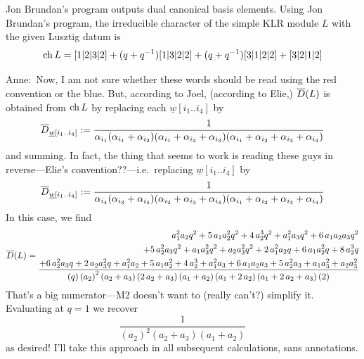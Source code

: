 \documentclass[11pt]{article}
\newcommand{\anne}[1]{{\color{pink!50!blue}Anne:~#1}}
\begin{document}
\begin{description}
Jon Brundan's program outputs dual canonical basis elements.
Using Jon Brundan's program, the irreducible character of the simple KLR module $L$ with the given Lusztig datum is 
\[
    \operatorname{ch} L = [1|2|3|2]+(q+q^{-1})[1|3|2|2]+(q+q^{-1})[3|1|2|2]+[3|2|1|2]
\]
\anne{Now, I am not sure whether these words should be read using the red convention or the blue. But, according to Joel, (according to Elie,) $\overline{D}(L)$  is obtained from $\operatorname{ch} L$ by replacing each $\underline{w}[i_1..i_4]$ by 
$$\overline{D}_{\underline{w}[i_1..i_4]}:= \frac 1 {\alpha_{i_1}(\alpha_{i_1} + \alpha_{i_2})(\alpha_{i_1} + \alpha_{i_2} + \alpha_{i_3})(\alpha_{i_1}+\alpha_{i_2} + \alpha_{i_3}+\alpha_{i_4})}$$ and summing. In fact, the thing that seems to work is reading these guys in reverse---Elie's convention??---i.e.\ replacing $\underline{w}[i_1..i_4]$ by 
$$\overline{D}_{\underline{w}[i_1..i_4]}:= \frac 1 {\alpha_{i_4}(\alpha_{i_3} + \alpha_{i_4})(\alpha_{i_2} + \alpha_{i_3} + \alpha_{i_4})(\alpha_{i_1}+\alpha_{i_2} + \alpha_{i_3}+\alpha_{i_4})}$$ 
In this case, we find %
{\tiny
$$
\overline{D} (L) =
\begin{aligned}{a}_{1}^{2}{a}_{2}q^{2}+5\,{a}_{1}{a}_{2}^{2}q^{2}+4\,{a}_{2}^{3}q^{2}+{a}_{1}^{2}{a}_{3}q^{2}+6\,{a}_{1}{a}_{2}{a}_{3}q^{2}\\
    +5\,{a}_{2}^{2}{a}_{3}q^{2}+{a}_{1}{a}_{3}^{2}q^{2}+{a}_{2}{a}_{3}^{2}q^{2}+2\,{a}_{1}^{2}{a}_{2}q+6\,{a}_{1}{a}_{2}^{2}q+8\,{a}_{2}^{3}q \\ 
    \frac{+6\,{a}_{2}^{2}{a}_{3}q+2\,{a}_{2}{a}_{3}^{2}q+{a}_{1}^{2}{a}_{2}+5\,{a}_{1}{a}_{2}^{2}+4\,{a}_{2}^{3}+{a}_{1}^{2}{a}_{3}+6\,{a}_{1}{a}_{2}{a}_{3}+5\,{a}_{2}^{2}{a}_{3}+{a}_{1}{a}_{3}^{2}+{a}_{2}{a}_{3}^{2}}{\left(q\right)\left({{a}_{2}}\right)^{2}\left({a}_{2}+{a}_{3}\right)\left(2\,{a}_{2}+{a}_{3}\right)\left({a}_{1}+{a}_{2}\right)\left({a}_{1}+2\,{a}_{2}\right)\left({a}_{1}+2\,{a}_{2}+{a}_{3}\right)\left(2\right)}
\end{aligned}
$$}
That's a big numerator---M2 doesn't want to (really can't?) simplify it. 
Evaluating at $q = 1$ we recover
$$\frac{1}{\left({{a}_{2}}\right)^{2}\left({a}_{2}+{a}_{3}\right)\left({a
      }_{1}+{a}_{2}\right)}$$
as desired! I'll take this approach in all subsequent calculations, sans annotations. 

}
\end{description}
\end{document}
